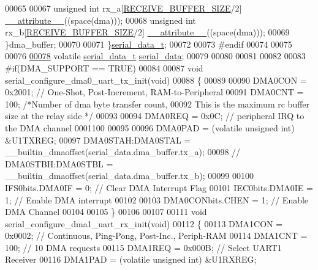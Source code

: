 \begin{DoxyCode}
00065 
00067         \textcolor{keywordtype}{unsigned} \textcolor{keywordtype}{int} rx\_a[\hyperlink{a00029_aa49ab378520c95fea987f93a7f3c9abf}{RECEIVE\_BUFFER\_SIZE}/2] 
      \hyperlink{a00028_a2068c3c2584547dbc1c8b9bca2d55b18}{\_\_attribute\_\_}((space(dma)));
00068         \textcolor{keywordtype}{unsigned} \textcolor{keywordtype}{int} rx\_b[\hyperlink{a00029_aa49ab378520c95fea987f93a7f3c9abf}{RECEIVE\_BUFFER\_SIZE}/2] 
      \hyperlink{a00028_a2068c3c2584547dbc1c8b9bca2d55b18}{\_\_attribute\_\_}((space(dma)));
00069         \}dma\_buffer;
00070 
00071 \}\hyperlink{a00028_d2/d4a/a00758}{serial\_data\_t};
00072 
00073 \textcolor{preprocessor}{#endif}
00074 
00075 
00076 
\hypertarget{a00028_source_l00078}{}\hyperlink{a00028_a77d3b77ccd59a0065642bf1ac7887b9d}{00078} \textcolor{keyword}{volatile} \hyperlink{a00028_d2/d4a/a00758}{serial\_data\_t} \hyperlink{a00028_a77d3b77ccd59a0065642bf1ac7887b9d}{serial\_data};
00079 
00080 
00081 
00082 
00083 \textcolor{preprocessor}{#if(DMA\_SUPPORT == TRUE)}
00084 
00087 \textcolor{keywordtype}{void}   serial\_configure\_dma0\_uart\_tx\_init(\textcolor{keywordtype}{void})
00088 \{
00089 
00090     DMA0CON = 0x2001;               \textcolor{comment}{// One-Shot, Post-Increment, RAM-to-Peripheral}
00091     DMA0CNT = 100;                  \textcolor{comment}{/*Number of dma byte transfer count,}
00092 \textcolor{comment}{                                     This is the maximum rc buffer size at the relay side */}
00093 
00094     DMA0REQ = 0x0C;               \textcolor{comment}{// peripheral IRQ to the DMA channel  0001100}
00095 
00096     DMA0PAD = (\textcolor{keyword}{volatile} \textcolor{keywordtype}{unsigned} int) &U1TXREG;
00097     DMA0STAH:DMA0STAL = \_\_builtin\_dmaoffset(serial\_data.dma\_buffer.tx\_a);
00098    \textcolor{comment}{// DMA0STBH:DMA0STBL = \_\_builtin\_dmaoffset(serial\_data.dma\_buffer.tx\_b);}
00099 
00100     IFS0bits.DMA0IF = 0;            \textcolor{comment}{// Clear DMA Interrupt Flag}
00101     IEC0bits.DMA0IE = 1;            \textcolor{comment}{// Enable DMA interrupt}
00102 
00103     DMA0CONbits.CHEN = 1;           \textcolor{comment}{// Enable DMA Channel}
00104 
00105 \}
00106 
00107 
00111 \textcolor{keywordtype}{void}   serial\_configure\_dma1\_uart\_rx\_init(\textcolor{keywordtype}{void})
00112 \{
00113 DMA1CON = 0x0002;                   \textcolor{comment}{// Continuous, Ping-Pong, Post-Inc., Periph-RAM}
00114 DMA1CNT = 100;                      \textcolor{comment}{// 10 DMA requests}
00115 DMA1REQ = 0x000B;                   \textcolor{comment}{// Select UART1 Receiver}
00116 DMA1PAD = (\textcolor{keyword}{volatile} \textcolor{keywordtype}{unsigned} int) &U1RXREG;

\end{DoxyCode}
